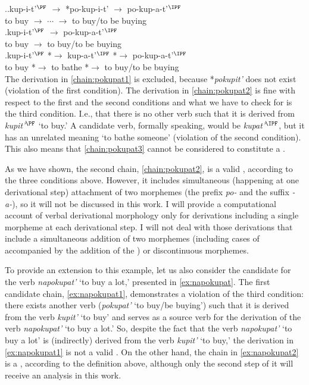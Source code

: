 \ex.\label{chain:pokupat}\ag.\label{chain:pokupat1}kup-i-t'$^\PF$ $\rightarrow$ *po-kup-i-t' $\rightarrow$ po-kup-a-t'$^\IPF$\\	
{to buy} $\rightarrow$ $\cdots$ $\rightarrow$ {to buy/to be buying}\\
\bg.\label{chain:pokupat2}kup-i-t'$^\PF$ $\rightarrow$ po-kup-a-t'$^\IPF$\\
{to buy} $\rightarrow$ {to buy/to be buying}\\
\bg.\label{chain:pokupat3}kup-i-t'$^\PF$ *$\rightarrow$ kup-a-t'$^\IPF$ *$\rightarrow$ po-kup-a-t'$^\IPF$\\
{to buy} *$\rightarrow$ {to bathe} *$\rightarrow$ {to buy/to be buying}\\

The derivation in \ref{chain:pokupat1} is excluded, because *\textit{pokupit'} does not exist (violation of the first condition). The derivation in \ref{chain:pokupat2} is fine with respect to the first and the second conditions and what we have to check for is the third condition. I.e., that there is no other verb such that it is derived from \textit{kupit'}$^\PF$ `to buy.'  A candidate verb, formally speaking, would be \textit{kupat'$^\IPF$}, but it has an unrelated meaning `to bathe someone' (violation of the second condition). This also means that \ref{chain:pokupat3} cannot be considered to constitute a .  

As we have shown, the second chain, \ref{chain:pokupat2}, is a valid , according to the three conditions above. However, it includes simultaneous (happening at one derivational step) attachment of two morphemes (the prefix \textit{po-} and the suffix \textit{-a-}), so it will not be discussed in this work. I will provide a computational account of verbal derivational morphology only for derivations including a single morpheme at each derivational step. I will not deal with those derivations that include a simultaneous addition of two morphemes (including cases of  accompanied by the addition of the ) or discontinuous morphemes.

To provide an extension to this example, let us also consider the candidate  for the verb \textit{napokupat'} `to buy a lot,' presented in \ref{ex:napokupat}. The first candidate chain, \ref{ex:napokupat1}, demonstrates a violation of the third condition: there exists another verb (\textit{pokupat'} `to buy/be buying') such that it is derived from the verb \textit{kupit'} `to buy' and serves as a source verb for the derivation of the verb \textit{napokupat'} `to buy a lot.' So, despite the fact that the verb \textit{napokupat'} `to buy a lot' is (indirectly) derived from the verb \textit{kupit'} `to buy,' the derivation in \ref{ex:napokupat1} is not a valid . On the other hand, the chain in \ref{ex:napokupat2} is a , according to the definition above, although only the second step of it will receive an analysis in this work. 

